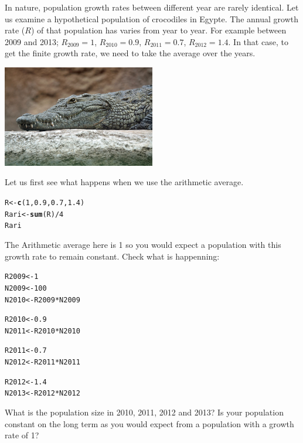 \documentclass{article}\usepackage[]{graphicx}\usepackage[]{color}
\makeatletter
\newcommand{\hlnum}[1]{\textcolor[rgb]{0.686,0.059,0.569}{#1}}%
\newcommand{\hlopt}[1]{\textcolor[rgb]{0,0,0}{#1}}%
\newcommand{\hlstd}[1]{\textcolor[rgb]{0.345,0.345,0.345}{#1}}%
\newcommand{\hlkwb}[1]{\textcolor[rgb]{0.69,0.353,0.396}{#1}}%
\newcommand{\hlkwd}[1]{\textcolor[rgb]{0.737,0.353,0.396}{\textbf{#1}}}%
\newenvironment{kframe}{%
 \def\at@end@of@kframe{}%
 \ifinner\ifhmode%
  \def\at@end@of@kframe{\end{minipage}}%
  \begin{minipage}{\columnwidth}%
 \fi\fi%
 \def\FrameCommand##1{\hskip\@totalleftmargin \hskip-\fboxsep
 \colorbox{shadecolor}{##1}\hskip-\fboxsep
     \hskip-\linewidth \hskip-\@totalleftmargin \hskip\columnwidth}%
 \MakeFramed {\advance\hsize-\width
   \@totalleftmargin\z@ \linewidth\hsize
   \@setminipage}}%
 {\par\unskip\endMakeFramed%
 \at@end@of@kframe}
\newenvironment{knitrout}{}{} %
\makeatother
\begin{document}
In nature, population growth rates between different year are rarely identical. Let us examine a hypothetical population of crocodiles in Egypte. The annual growth rate ($R$) of that population has varies from year to year. For example between 2009 and 2013; $R_{2009}=1$, $R_{2010}=0.9$, $R_{2011}=0.7$, $R_{2012}=1.4$. In that case, to get the finite growth rate, we need to take the average over the years. 
\vspace{1.5ex}
\begin{center}
\includegraphics[width=0.5\textwidth]{crocodile.jpg}
\end{center}

\noindent Let us first see what happens when we use the arithmetic average. 
\begin{knitrout}
\color{fgcolor}\begin{kframe}
\begin{alltt}
\hlstd{R} \hlkwb{<-} \hlkwd{c}\hlstd{(}\hlnum{1}\hlstd{,} \hlnum{0.9}\hlstd{,} \hlnum{0.7}\hlstd{,} \hlnum{1.4}\hlstd{)}
\hlstd{Rari} \hlkwb{<-} \hlkwd{sum}\hlstd{(R)} \hlopt{/} \hlnum{4}
\hlstd{Rari}
\end{alltt}
\end{kframe}
\end{knitrout}

\noindent The Arithmetic average here is 1 so you would expect a population with this growth rate to remain constant. Check what is happenning:

\begin{knitrout}
\color{fgcolor}\begin{kframe}
\begin{alltt}
\hlstd{R2009}\hlkwb{<-}\hlnum{1}
\hlstd{N2009}\hlkwb{<-}\hlnum{100}
\hlstd{N2010}\hlkwb{<-}\hlstd{R2009}\hlopt{*}\hlstd{N2009}

\hlstd{R2010}\hlkwb{<-}\hlnum{0.9}
\hlstd{N2011}\hlkwb{<-}\hlstd{R2010}\hlopt{*}\hlstd{N2010}

\hlstd{R2011}\hlkwb{<-}\hlnum{0.7}
\hlstd{N2012}\hlkwb{<-}\hlstd{R2011}\hlopt{*}\hlstd{N2011}

\hlstd{R2012}\hlkwb{<-}\hlnum{1.4}
\hlstd{N2013}\hlkwb{<-}\hlstd{R2012}\hlopt{*}\hlstd{N2012}
\end{alltt}
\end{kframe}
\end{knitrout}
\noindent What is the population size in 2010, 2011, 2012 and 2013? Is your population constant on the long term as you would expect from a population with a growth rate of 1?
\end{document}
